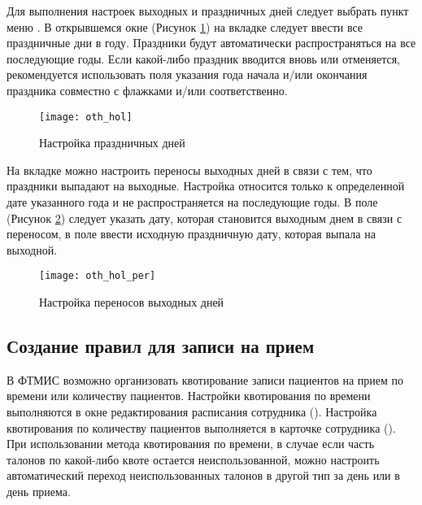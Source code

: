 Для выполнения настроек выходных и праздничных дней следует выбрать пункт меню . В открывшемся окне (Рисунок \ref{img_oth_hol}) на вкладке  следует ввести все праздничные дни в году. Праздники будут автоматически распространяться на все последующие годы. Если какой-либо праздник вводится вновь или отменяется, рекомендуется использовать поля указания года начала и/или окончания праздника совместно с флажками  и/или  соответственно.
 
\begin{figure}[ht]\centering
 \texttt{[image: oth\_hol]}
 \caption{Настройка праздничных дней}
 \label{img_oth_hol}
\end{figure}

На вкладке  можно настроить переносы выходных дней в связи с тем, что праздники выпадают на выходные. Настройка относится только к определенной дате указанного года и не распространяется на последующие годы. В поле  (Рисунок \ref{img_oth_hol_per}) следует указать дату, которая становится выходным днем в связи с переносом, в поле  ввести исходную праздничную дату, которая выпала на выходной.

\begin{figure}[ht]\centering
 \texttt{[image: oth\_hol\_per]}
 \caption{Настройка переносов выходных дней}
 \label{img_oth_hol_per}
\end{figure}

\subsection{Создание правил для записи на прием}

В ФТМИС возможно организовать квотирование записи пациентов на прием по времени или количеству пациентов. Настройки квотирования по времени выполняются в окне редактирования расписания сотрудника (). Настройка квотирования по количеству пациентов выполняется в карточке сотрудника (). При использовании метода квотирования по времени, в случае если часть талонов по какой-либо квоте остается неиспользованной, можно настроить автоматический переход неиспользованных талонов в другой тип за день или в день приема.

